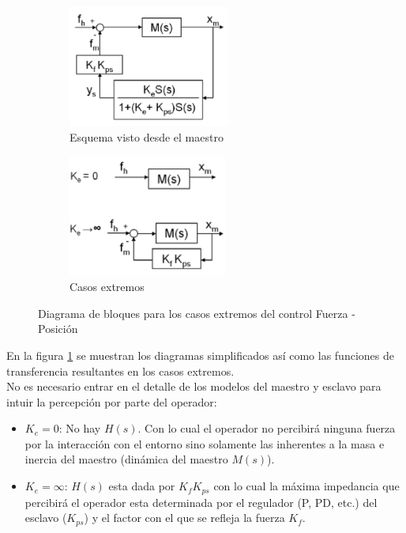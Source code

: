 \begin{figure}[htbp]
\centering
	\begin{subfigure}[h]
		\centering
		\includegraphics[height=4cm]{force-pos-operator}
		\caption{Esquema visto desde el maestro}
	\end{subfigure}
	\begin{subfigure}[h]
		\centering
		\includegraphics[height=4cm]{force-pos-kvalues}
		\caption{Casos extremos}
    \end{subfigure}
	\caption{Diagrama de bloques para los casos extremos del control Fuerza - Posición}
  	\label{fig:force-pos-casos}
\end{figure}

En la figura \ref{fig:force-pos-casos} se muestran los diagramas simplificados así como las funciones de transferencia resultantes en los casos extremos.
\\
No es necesario entrar en el detalle de los modelos del maestro y esclavo para intuir la percepción por parte del operador:
\begin{itemize}
\item $K_e = 0$: No hay $H(s)$. Con lo cual el operador no percibirá ninguna fuerza por la interacción con el entorno sino solamente las inherentes a la masa e inercia del maestro (dinámica del maestro $M(s)$).
\item $K_e = \infty$: $H(s)$ esta dada por $K_{f}K_{ps}$ con lo cual la máxima impedancia que percibirá el operador esta determinada por el regulador (P, PD, etc.) del esclavo ($K_{ps}$) y el factor con el que se refleja la fuerza $K_{f}$.
\end{itemize}

